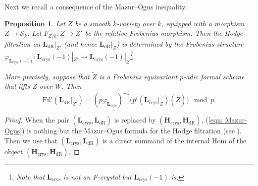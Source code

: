\documentclass[11pt, letterpaper]{amsart}
\theoremstyle{plain}
\newtheorem{proposition}[theorem]{Proposition}
\theoremstyle{definition}
\newcommand{\<}{\langle}
\renewcommand{\>}{\rangle}
\def\wt{\widetilde}
\newcommand{\shS}{\mathscr{S}}
\newcommand{\bL}{\mathbf{L}}
\newcommand{\crys}{\mathrm{crys}}
\newcommand{\bH}{\mathbf{H}}
\newcommand{\dR}{\mathrm{dR}}
\newcommand{\Fil}{\mathrm{Fil}}
\begin{document}
Next we recall a consequence of the Mazur--Ogus inequality.
\begin{proposition}
\label{prop: Mazur-Ogus}
    Let $Z$ be a smooth $k$-variety over $k$, equipped with a morphism $Z \to \shS_k$. 
    Let $F_{Z/k} : Z \to Z'$ be the relative Frobenius morphism. 
    Then the Hodge filtration on $\bL_\dR|_{Z'}$ (and hence $\bL_\dR|_Z$) is determined by the Frobenius structure $\varphi_{\bL_\crys(-1)} : \bL_\crys(-1)|_{Z'} \to \bL_\crys(-1)|_Z$\footnote{Note that $\bL_\crys$ is not an F-crystal but $\bL_\crys(-1)$ is. }.
    
    More precisely, suppose that $\wt{Z}$ is a Frobenius equivariant $p$-adic formal scheme that lifts $Z$ over $W$. 
    Then 
    \begin{equation}
        \label{eqn: Mazur-Ogus}
        \Fil^i (\bL_\dR|_{Z'}) =  (p\varphi_{\bL_\crys})^{-1} \big( p^i (\bL_\crys|_{Z})({\wt{Z}}) \big) \mod p.
    \end{equation}
\end{proposition}
\begin{proof}
    When the pair $(\bL_\crys, \bL_\dR)$ is replaced by $(\bH_\crys, \bH_\dR)$, (\ref{eqn: Mazur-Ogus}) is nothing but the Mazur--Ogus formula for the Hodge filtration (see \cite[Thm.~8.26]{BOBook}). 
    Then we use that $(\bL_\crys, \bL_\dR)$ is a direct summand of the internal Hom of the object $(\bH_\crys, \bH_\dR)$. 
\end{proof}
\end{document}
